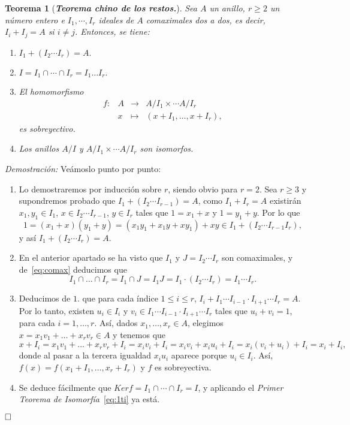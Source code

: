 \documentclass[12pt]{article}
\newtheorem{theorem}{Teorema}[section]
\begin{document}
\begin{theorem}[\textbf{\textit{Teorema chino de los restos.}}]
Sea $A$ un anillo, $r \geq 2$ un número entero e $I_{1}, \cdots, I_{r}$ ideales de $A$ comaximales dos a dos, es decir, $I_{i} + I_{j} = A$ si $i \neq j$. Entonces, se tiene: \begin{enumerate}
\item $I_{1} + (I_{2} \cdots I_{r}) = A.$
\item $I = I_{1} \cap \cdots \cap I_{r} = I_{1} \ldots I_{r}.$
\item El homomorfismo $$\begin{array}{rccl}
f \colon &A&\longrightarrow &A/I_{1}\times \cdots A/I_{r} \\
&x& \longmapsto &(x + I_{1}, \ldots, x+ I_{r}),
\end{array}
$$ es sobreyectivo.
\item Los anillos $A/I$ y $A/I_{1}\times \cdots A/I_{r}$ son isomorfos.
\end{enumerate} 
\end{theorem}
\emph{Demostración: } Veámoslo punto por punto: \begin{enumerate}
\item Lo demostraremos por inducción sobre $r$, siendo obvio para $r = 2$. Sea $r \geq 3$ y supondremos probado que $I_{1} + (I_{2} \cdots I_{r-1}) = A$, como $I_{1} + I_{r} = A$ existirán $x_{1},y_{1} \in I_{1}$, $x \in I_{2} \cdots I_{r-1}$, $y \in I_{r}$ tales que $1 = x_{1} + x$ y $1 = y_{1} + y$. Por lo que $$1 = (x_{1} +x)(y_{1} + y)=(x_{1}y_{1} + x_{1}y + xy_{1}) + xy \in I_{1} + (I_{2} \cdots I_{r-1}I_{r}),$$ y así $I_{1} + (I_{2} \cdots I_{r}) = A.$
\item En el anterior apartado se ha visto que $I_{1}$ y $J= I_{2} \cdots I_{r}$ son comaximales, y de~\ref{eq:comax} deducimos que $$I_{1} \cap \ldots \cap I_{r} = I_{1} \cap J = I_{1}J = I_{1} \cdot (I_{2} \cdots I_{r}) = I_{1} \cdots I_{r}.$$
\item Deducimos de $1.$ que para cada índice $1 \leq i \leq r$, $I_{i} +I_{1}\cdots I_{i-1}\cdot I_{i+1} \cdots I_{r} = A.$ Por lo tanto, existen $u_{i} \in I_{i}$ y $v_{i} \in I_{1}\cdots I_{i-1}\cdot I_{i+1} \cdots I_{r}$ tales que $u_{i} + v_{i} = 1$, para cada $i = 1, \ldots, r$. Así, dados $x_{1}, \ldots, x_{r} \in A$, elegimos $x = x_{1}v_{1} + \ldots + x_{r}v_{r} \in A$ y tenemos que $$x + I_{i} = x_{1}v_{1} + \ldots + x_{r}v_{r} + I_{i} = x_{i}v_{i} + I_{i} =  x_{i}v_{i} +x_{i}u_{i} + I_{i} = x_{i}(v_{i} + u_{i}) + I_{i} = x_{i} + I_{i},$$ donde al pasar a la tercera igualdad $x_{i}u_{i}$ aparece porque $u_{i} \in I_{i}$. Así, $f(x) = f(x_{1} + I_{1}, \ldots, x_{r} + I_{r})$ y $f$ es sobreyectiva. 
\item Se deduce fácilmente que $Ker f = I_{1} \cap \cdots \cap I_{r} = I$, y aplicando el \textit{Primer Teorema de Isomorfía}~\ref{eq:1ti} ya está.
\end{enumerate}
$\hfill \square$
\end{document}
